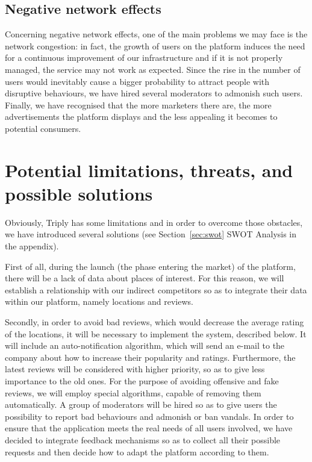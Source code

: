 \documentclass[letterpaper, 11pt]{Proposal}
\def\Sec#1{Section~\ref{#1}}
\begin{document}
\subsection{Negative network effects}
Concerning negative network effects, one of the main problems we may face is the network congestion: in fact, the growth of users on the platform induces the need for a continuous improvement of our infrastructure and if it is not properly managed, the service may not work as expected.
Since the rise in the number of users would inevitably cause a bigger probability to attract people with disruptive behaviours, we have hired several moderators to admonish such users.
Finally, we have recognised that the more marketers there are, the more advertisements the platform displays and the less appealing it becomes to potential consumers.

\section{Potential limitations, threats, and possible solutions}
Obviously, Triply has some limitations and in order to overcome those obstacles, we have introduced several solutions (see \Sec{sec:swot} SWOT Analysis in the appendix).

First of all, during the launch (the phase entering the market) of the platform, there will be a lack of data about places of interest. For this reason, we will establish a relationship with our indirect competitors so as to integrate their data within our platform, namely locations and reviews.

Secondly, in order to avoid bad reviews, which would decrease the average rating of the locations, it will be necessary to implement the system, described below.
It will include an auto-notification algorithm, which will send an e-mail to the company about how to increase their popularity and ratings. Furthermore, the latest reviews will be considered with higher priority, so as to give less importance to the old ones. For the purpose of avoiding offensive and fake reviews, we will employ special algorithms, capable of removing them automatically. A group of moderators will be hired so as to give users the possibility to report bad behaviours and admonish or ban vandals. In order to ensure that the application meets the real needs of all users involved, we have decided to integrate feedback mechanisms so as to collect all their possible requests and then decide how to adapt the platform according to them.
\end{document}
